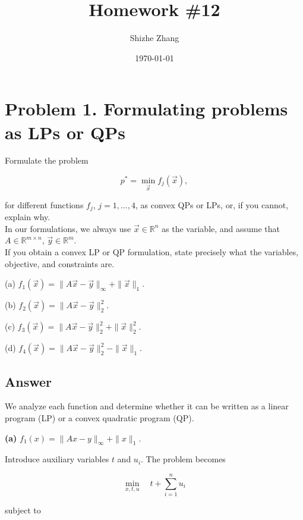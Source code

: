 \documentclass[
	12pt,
]{fphw}
\title{Homework \#12} %
\author{Shizhe Zhang} %
\date{\today} %
\institute{University of California, Berkeley \\ Department of Statistics} %
\begin{document}
\maketitle %


\section*{Problem 1. Formulating problems as LPs or QPs}

Formulate the problem

\[
p^* = \min_{\vec{x}} f_j(\vec{x}),
\]

for different functions \(f_j\), \(j = 1, \ldots, 4\), as convex QPs or LPs, or, if you cannot, explain why. 
\\In our formulations, we always use \(\vec{x} \in \mathbb{R}^n\) as the variable, and assume that \(A \in \mathbb{R}^{m \times n}\), \(\vec{y} \in \mathbb{R}^m\). 
\\If you obtain a convex LP or QP formulation, state precisely what the variables, objective, and constraints are.

(a) \(f_1(\vec{x}) = \|A\vec{x} - \vec{y}\|_\infty + \|\vec{x}\|_1.\)

(b) \(f_2(\vec{x}) = \|A\vec{x} - \vec{y}\|_2^2.\)

(c) \(f_3(\vec{x}) = \|A\vec{x} - \vec{y}\|_2^2 + \|\vec{x}\|_2^2.\)

(d) \(f_4(\vec{x}) = \|A\vec{x} - \vec{y}\|_2^2 - \|\vec{x}\|_1.\)

\subsection*{Answer}

We analyze each function and determine whether it can be written as a linear program (LP) or a convex quadratic program (QP).

\textbf{(a)} \(f_1(x) = \|Ax - y\|_\infty + \|x\|_1.\)

Introduce auxiliary variables \(t\) and \(u_i\). The problem becomes

\[
\min_{x,t,u} \quad t + \sum_{i=1}^{n} u_i
\]

subject to
\end{document}
